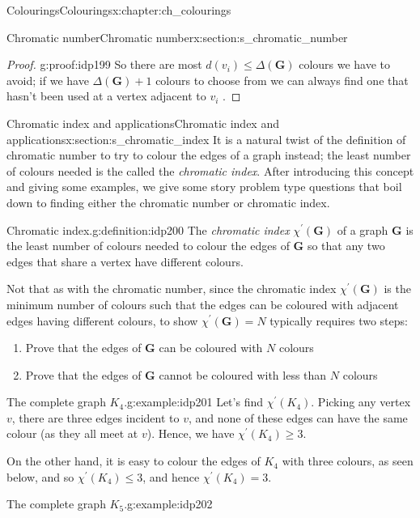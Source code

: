 \documentclass[oneside,10pt,]{book}
\numberwithin{equation}{section}
\newcommand{\bfG}{\mathbf{G}}
\begin{document}
\begin{chapterptx}{Colourings}{}{Colourings}{}{}{x:chapter:ch_colourings}
\begin{sectionptx}{Chromatic number}{}{Chromatic number}{}{}{x:section:s_chromatic_number}
\begin{proof}{}{g:proof:idp199}
So there are most \(d(v_i)\leq \Delta(\bfG)\) colours we have to avoid; if we have \(\Delta(\bfG)+1\) colours to choose from we can always find one that hasn't been used at a vertex adjacent to \(v_i\)%
.\end{proof}
\end{sectionptx}
%
%
\typeout{************************************************}
\typeout{************************************************}
%
\begin{sectionptx}{Chromatic index and applications}{}{Chromatic index and applications}{}{}{x:section:s_chromatic_index}
It is a natural twist of the definition of chromatic number to try to colour the edges of a graph instead; the least number of colours needed is the called the \emph{chromatic index}.  After introducing this concept and giving some examples, we give some story problem type questions that boil down to finding either the chromatic number or chromatic index.%
\begin{definition}{Chromatic index.}{g:definition:idp200}%
The \emph{chromatic index} \(\chi^\prime(\bfG)\) of a graph \(\bfG\) is the least number of colours needed to colour the edges of \(\bfG\) so that any two edges that share a vertex have different colours.%
\end{definition}
Not that as with the chromatic number, since the chromatic index \(\chi^\prime(\bfG)\) is the minimum number of colours such that the edges can be coloured with adjacent edges having different colours, to show \(\chi^\prime(\bfG)=N\) typically requires two steps:%
%
\begin{enumerate}
\item{}Prove that the edges of \(\bfG\) can be coloured with \(N\) colours%
\item{}Prove that the edges of \(\bfG\) cannot be coloured with less than \(N\) colours%
\end{enumerate}
\begin{example}{The complete graph \(K_4\).}{g:example:idp201}%
Let's find \(\chi^\prime(K_4)\).  Picking any vertex \(v\), there are three edges incident to \(v\), and none of these edges can have the same colour (as they all meet at \(v\)).  Hence, we have \(\chi^\prime(K_4)\geq 3\).%
\par
On the other hand, it is easy to colour the edges of \(K_4\) with three colours, as seen below, and so \(\chi^\prime(K_4)\leq 3\), and hence \(\chi^\prime(K_4)=3\).%
\end{example}
\begin{example}{The complete graph \(K_5\).}{g:example:idp202}%

\end{example}
\end{sectionptx}
\end{chapterptx}
\end{document}
